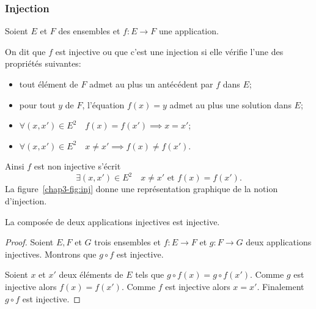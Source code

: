 \subsubsection{Injection}
\label{chap3-subsubsec:injection}
Soient \(E\) et \(F\) des ensembles et \(f: E \longrightarrow F\) une application.
\begin{defdef}
  On dit que \(f\) est injective ou que c'est une injection si elle vérifie l'une des propriétés suivantes:
  \begin{itemize}
  \item tout élément de \(F\) admet au plus un antécédent par \(f\) dans \(E\);
  \item pour tout \(y\) de \(F\), l'équation \(f(x)=y\) admet au plus une solution dans \(E\);
  \item \(\forall (x,x') \in E^2 \quad f(x)=f(x') \implies x=x'\);
  \item \(\forall (x,x') \in E^2 \quad  x \neq x' \implies f(x) \neq f(x')\).
  \end{itemize}
  Ainsi \(f\) est non injective s'écrit
  \begin{equation}
    \exists (x,x') \in E^2 \quad x \neq x' \text{~et~} f(x) = f(x').
  \end{equation}
  La figure~\ref{chap3-fig:inj} donne une représentation graphique de la notion d'injection.
\end{defdef}
\begin{theo}
  La composée de deux applications injectives est injective.
\end{theo}
\begin{proof}
  Soient \(E,F\) et \(G\) trois ensembles et \(f:E \longrightarrow F\) et \(g: F \longrightarrow G\) deux applications injectives. Montrons que \(g \circ f\) est injective. 

Soient \(x\) et \(x'\) deux éléments de \(E\) tels que \(g \circ f(x) = g \circ f(x')\). Comme \(g\) est injective alors \(f(x)=f(x')\). Comme \(f\) est injective alors \(x=x'\). Finalement \(g \circ f\) est injective.
\end{proof}
